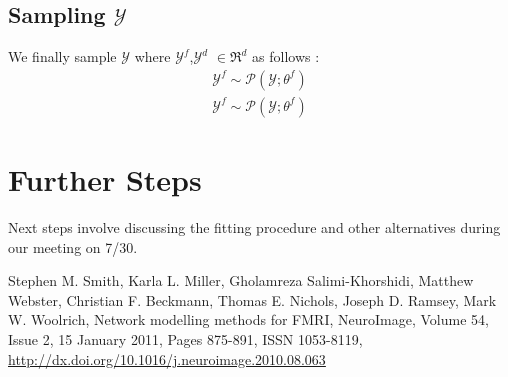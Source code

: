 \documentclass[a4paper,10pt]{article}
\begin{document}
\subsection{Sampling $\mathcal{Y}$}
We finally sample $\mathcal{Y}$ where $\mathcal{Y}^{f}$,$\mathcal{Y}^{d}$ $\in \Re^{d}$ as follows :
\begin{align*}
\mathcal{Y}^{f} \sim \mathcal{P}(\mathcal{Y};\theta^{f})\\
\mathcal{Y}^{f} \sim \mathcal{P}(\mathcal{Y};\theta^{f})
\end{align*}
\section{Further Steps}
Next steps involve discussing the fitting procedure and other alternatives during our meeting on 7/30. 
\begin{thebibliography}{99}
     Stephen M. Smith, Karla L. Miller, Gholamreza Salimi-Khorshidi, Matthew Webster, Christian F. Beckmann, Thomas E. Nichols, Joseph D. Ramsey, Mark W. Woolrich, Network modelling methods for FMRI, NeuroImage, Volume 54, Issue 2, 15 January 2011, Pages 875-891, ISSN 1053-8119, \url{http://dx.doi.org/10.1016/j.neuroimage.2010.08.063}

    
\end{thebibliography}
\end{document}
